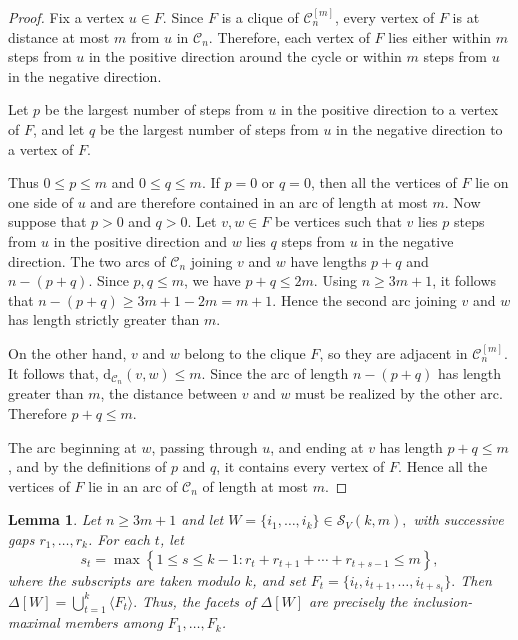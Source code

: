\documentclass[12pt,reqno]{amsart}
\newtheorem{lemma}[theorem]{Lemma}
\theoremstyle{definition}
\numberwithin{equation}{section}
\def\C{\mathcal{C}}
\begin{document}
\begin{proof}
	Fix a vertex $u\in F$. Since $F$ is a clique of $\C_n^{[m]}$, every
	vertex of $F$ is at distance at most $m$ from $u$ in $\C_n$. Therefore,
	each vertex of $F$ lies either within $m$ steps from $u$ in the positive
	direction around the cycle or within $m$ steps from $u$ in the negative
	direction.
	
	Let $p$ be the largest number of steps from $u$ in the positive direction
	to a vertex of $F$, and let $q$ be the largest number of steps from $u$
	in the negative direction to a vertex of $F$. 
	
	Thus
	\( 0\leq p\leq m \) and \( 0\leq q\leq m. \)
	If $p=0$ or $q=0$, then all the vertices of $F$ lie on one side of $u$
	and are therefore contained in an arc of length at most $m$. Now suppose that $p>0$ and $q>0$. Let $v,w\in F$ be vertices such that
	$v$ lies $p$ steps from $u$ in the positive direction and $w$ lies $q$
	steps from $u$ in the negative direction. The two arcs of $\C_n$ joining
	$v$ and $w$ have lengths \( p+q \) and \( n-(p+q). \)
	Since $p,q\leq m$, we have \( p+q\leq 2m. \)
	Using $n\geq3m+1$, it follows that \( 	n-(p+q)
	\geq
	3m+1-2m
	=
	m+1. \) Hence the second arc joining $v$ and $w$ has length strictly greater
	than $m$.
	
	On the other hand, $v$ and $w$ belong to the clique $F$, so they are
	adjacent in $\C_n^{[m]}$. It follows that,
	\( \mathrm{d}_{\C_n}(v,w)\leq m. \)
	Since the arc of length $n-(p+q)$ has length greater than $m$, the
	distance between $v$ and $w$ must be realized by the other arc. Therefore
	\( p+q\leq m. \)
	
	The arc beginning at $w$, passing through $u$, and ending at $v$ has
	length $p+q\leq m$, and by the definitions of $p$ and $q$, it contains
	every vertex of $F$. Hence all the vertices of $F$ lie in an arc of
	$\C_n$ of length at most $m$.
\end{proof}
\begin{lemma}\label{lem:facetsW}
	Let $n\geq3m+1$ and let \( 	W=\{i_1,\ldots,i_k\}\in\mathcal S_V(k,m), \)
	with successive gaps $r_1,\ldots,r_k$. For each $t$, let
	\[
	s_t=\max\left\{1\leq s\leq k-1:
	r_t+r_{t+1}+\cdots+r_{t+s-1}\leq m\right\},
	\]
	where the subscripts are taken modulo $k$, and set
	\( F_t=\{i_t,i_{t+1},\ldots,i_{t+s_t}\}. \)
	Then \( \Delta[W]=\bigcup_{t=1}^k\langle F_t\rangle. \)
	Thus, the facets of $\Delta[W]$ are precisely the
	inclusion-maximal members among $F_1,\ldots,F_k$.
\end{lemma}
\end{document}
